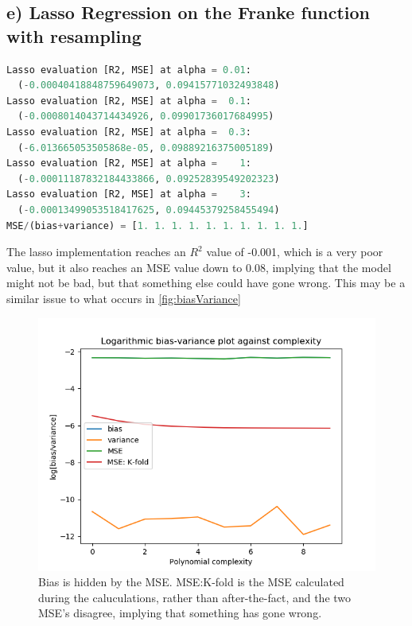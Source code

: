 \documentclass[a4paper, UKenglish]{article}
\newcommand{\0}{\mathbf{0}}
\newcommand{\1}{\mathbf{1}}
\begin{document}
\subsection{e) Lasso Regression on the Franke function with resampling} \label{sec:results Lasso}
\begin{lstlisting}[language=python]
Lasso evaluation [R2, MSE] at alpha = 0.01: 
  (-0.00040418848759649073, 0.09415771032493848)
Lasso evaluation [R2, MSE] at alpha =  0.1: 
  (-0.0008014043714434926, 0.09901736017684995)
Lasso evaluation [R2, MSE] at alpha =  0.3: 
  (-6.013665053505868e-05, 0.09889216375005189)
Lasso evaluation [R2, MSE] at alpha =    1: 
  (-0.00011187832184433866, 0.09252839549202323)
Lasso evaluation [R2, MSE] at alpha =    3: 
  (-0.00013499053518417625, 0.09445379258455494)
MSE/(bias+variance) = [1. 1. 1. 1. 1. 1. 1. 1. 1. 1.]
\end{lstlisting}


The lasso implementation reaches an $R^2$ value of -0.001, which is a very poor value, but it also reaches an MSE value down to 0.08, implying that the model might not be bad, but that something else could have gone wrong. This may be a similar issue to what occurs in \autoref{fig:biasVariance}


\begin{figure}[H]
        \centering 
        \includegraphics[scale=0.75]{../outputs/images/partE/lassoBiasVariance.png} 
        \caption{Bias is hidden by the MSE. MSE:K-fold is the MSE calculated during the caluculations, rather than after-the-fact, and the two MSE's disagree, implying that something has gone wrong.}
        \label{fig:LassoBiasVariance}
\end{figure}
\end{document}
